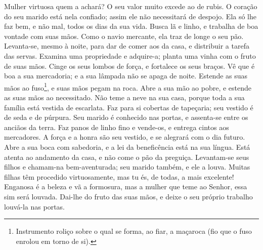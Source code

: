 Mulher virtuosa quem a achará? O seu valor muito excede ao de
rubis. O coração do seu marido está nela confiado; assim ele
não necessitará de despojo. Ela só lhe faz bem, e não mal,
todos os dias da sua vida. Busca lã e linho, e trabalha de
boa vontade com suas mãos. Como o navio mercante, ela traz de
longe o seu pão. Levanta-se, mesmo à noite, para dar de comer
aos da casa, e distribuir a tarefa das servas. Examina uma
propriedade e adquire-a; planta uma vinha com o fruto de suas mãos.
Cinge os seus lombos de força, e fortalece os seus braços.
Vê que é boa a sua mercadoria; e a sua lâmpada não se apaga
de noite. Estende as suas mãos ao fuso\footnote{Instrumento
roliço sobre o qual se forma, ao fiar, a maçaroca (fio que o fuso
enrolou em torno de si).}, e suas mãos pegam na roca. Abre a
sua mão ao pobre, e estende as suas mãos ao necessitado. Não
teme a neve na sua casa, porque toda a sua família está vestida de
escarlata. Faz para si cobertas de tapeçaria; seu vestido é
de seda e de púrpura. Seu marido é conhecido nas portas, e
assenta-se entre os anciãos da terra. Faz panos de linho fino
e vende-os, e entrega cintos aos mercadores. A força e a
honra são seu vestido, e se alegrará com o dia futuro. Abre a
sua boca com sabedoria, e a lei da beneficência está na sua língua.
Está atenta ao andamento da casa, e não come o pão da
preguiça. Levantam-se seus filhos e chamam-na bem-aventurada;
seu marido também, e ele a louva. Muitas filhas têm procedido
virtuosamente, mas tu és, de todas, a mais excelente!
Enganosa é a beleza e vã a formosura, mas a mulher que teme
ao Senhor, essa sim será louvada. Dai-lhe do fruto das suas
mãos, e deixe o seu próprio trabalho louvá-la nas portas.

